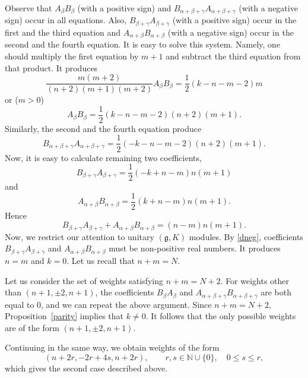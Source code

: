 \documentclass[twoside,a4paper,12pt]{article}
\newcommand{\g}{\ensuremath{\mathfrak g}}
\theoremstyle{definition}
\begin{document}
Observe that $A_\beta B_\beta$ (with a positive sign) and
$B_{\alpha+\beta+\gamma}A_{\alpha+\beta+\gamma}$ (with a negative sign) occur
in all equations. Also, $B_{\beta+\gamma}A_{\beta+\gamma}$ (with a positive
sign) occur in the first and the third equation and
$A_{\alpha+\beta}B_{\alpha+\beta}$ (with a negative sign) occur in the second
and the fourth equation. It is easy to solve this system. Namely, one should
multiply the first equation by $m+1$ and subtract the third equation from that
product. It produces
\begin{equation*}
	\frac{m(m+2)}{(n+2)(m+1)(m+2)}A_\beta B_\beta=\frac12(k-n-m-2)m
\end{equation*}
or ($m>0$)
\begin{equation*}
	A_\beta B_\beta=\frac12(k-n-m-2)(n+2)(m+1).
\end{equation*}
Similarly, the second and the fourth equation produce
\begin{equation*}
	B_{\alpha+\beta+\gamma}A_{\alpha+\beta+\gamma}=\frac12(-k-n-m-2)(n+2)(m+1).
\end{equation*}
Now, it is easy to calculate remaining two coefficients,
\begin{equation*}
	B_{\beta+\gamma}A_{\beta+\gamma}=\frac12(-k+n-m)n(m+1)
\end{equation*}
and
\begin{equation*}
	A_{\alpha+\beta}B_{\alpha+\beta}=\frac12(k+n-m)n(m+1).
\end{equation*}
Hence
\begin{equation*}
	B_{\beta+\gamma}A_{\beta+\gamma}+A_{\alpha+\beta}B_{\alpha+\beta}=
	(n-m)n(m+1).
\end{equation*}
Now, we restrict our attention to unitary $(\g,K)$ modules. By \eqref{dneg},
coefficients $B_{\beta+\gamma}A_{\beta+\gamma}$ and
$A_{\alpha+\beta}B_{\alpha+\beta}$ must be non-positive real numbers.
It produces $n=m$ and $k=0$. Let us recall that $n+m=N$.

Let us consider the set of weights satisfying $n+m=N+2$. For weights other
than $(n+1,\pm2,n+1)$, the coefficients $B_\beta A_\beta$ and
$A_{\alpha+\beta+\gamma}B_{\alpha+\beta+\gamma}$ are both equal to $0$,
and we can repeat the above argument. Since $n+m=N+2$, Proposition~\ref{parity}
implies that $k\neq0$. It follows that the only possible weights are of the
form $(n+1,\pm2,n+1)$.

Continuing in the same way, we obtain weights of the form
\[ (n+2r,-2r+4s,n+2r), \qquad r,s\in\mathbb N\cup\{0\},\quad 0\leq s\leq r, \]
which gives the second case described above.
\end{document}

